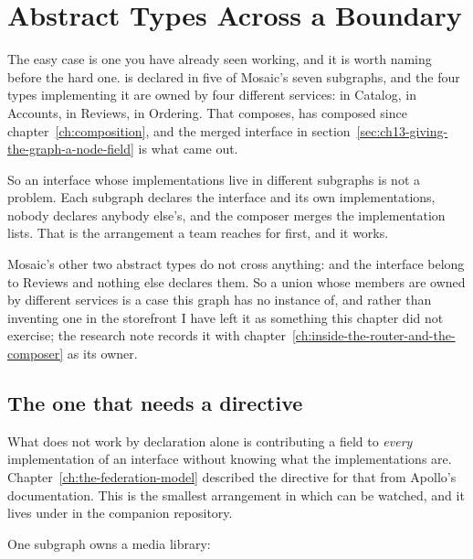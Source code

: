 \section{Abstract Types Across a Boundary}
\label{sec:ch13-abstract-types-across-a-boundary}
%

%
The easy case is one you have already seen working, and it is worth naming
before the hard one.  is declared in five of Mosaic's seven
subgraphs, and the four types implementing it are owned by four different
services:  in Catalog,  in Accounts, 
in Reviews,  in Ordering. That composes, has composed since
chapter~\ref{ch:composition}, and the merged interface in
section~\ref{sec:ch13-giving-the-graph-a-node-field} is what came out.

So an interface whose implementations live in different subgraphs is not a
problem. Each subgraph declares the interface and its own implementations,
nobody declares anybody else's, and the composer merges the implementation
lists. That is the arrangement a team reaches for first, and it works.

Mosaic's other two abstract types do not cross anything: 
and the  interface belong to Reviews and nothing else declares them.
So a union whose members are owned by different services is a case this graph
has no instance of, and rather than inventing one in the storefront I have left
it as something this chapter did not exercise; the research note records it with
chapter~\ref{ch:inside-the-router-and-the-composer} as its owner.

\subsection*{The one that needs a directive}

%
What does not work by declaration alone is contributing a field to \emph{every}
implementation of an interface without knowing what the implementations are.
Chapter~\ref{ch:the-federation-model} described the directive for that from
Apollo's documentation. This is the smallest arrangement in which
 can be watched, and it lives under  in
the companion repository.

One subgraph owns a media library:

